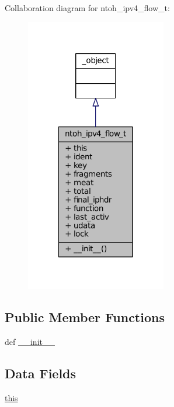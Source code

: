 Collaboration diagram for ntoh\-\_\-ipv4\-\_\-flow\-\_\-t\-:
\nopagebreak
\begin{figure}[H]
\begin{center}
\leavevmode
\includegraphics[width=174pt]{classlibntoh_1_1ntoh__ipv4__flow__t__coll__graph}
\end{center}
\end{figure}
\subsection*{Public Member Functions}
\begin{DoxyCompactItemize}
\item 
def \hyperlink{classlibntoh_1_1ntoh__ipv4__flow__t_ac775ee34451fdfa742b318538164070e}{\-\_\-\-\_\-init\-\_\-\-\_\-}
\end{DoxyCompactItemize}
\subsection*{Data Fields}
\begin{DoxyCompactItemize}
\item 
\hyperlink{classlibntoh_1_1ntoh__ipv4__flow__t_a05c09a5e9d53fa7adf0a7936038c2fa3}{this}
\end{DoxyCompactItemize}
